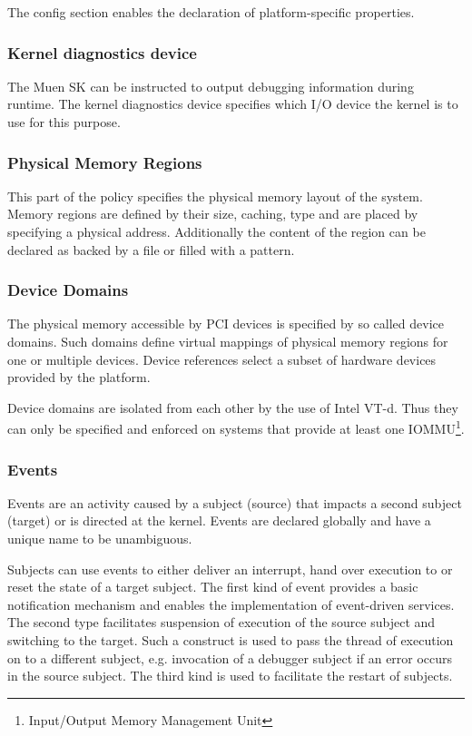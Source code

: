\documentclass[a4paper,twoside,titlepage]{article}
\begin{document}
The config section enables the declaration of platform-specific properties.

\subsubsection{Kernel diagnostics device}
The Muen SK can be instructed to output debugging information during runtime.
The kernel diagnostics device specifies which I/O device the kernel is to use
for this purpose.

\subsubsection{Physical Memory Regions}
This part of the policy specifies the physical memory layout of the system.
Memory regions are defined by their size, caching, type and are placed by
specifying a physical address. Additionally the content of the region can be
declared as backed by a file or filled with a pattern.

\subsubsection{Device Domains}
The physical memory accessible by PCI devices is specified by so called device
domains. Such domains define virtual mappings of physical memory regions for one
or multiple devices. Device references select a subset of hardware devices
provided by the platform.

Device domains are isolated from each other by the use of Intel VT-d. Thus they
can only be specified and enforced on systems that provide at least one
IOMMU\footnote{Input/Output Memory Management Unit}.

\subsubsection{Events}
Events are an activity caused by a subject (source) that impacts a second
subject (target) or is directed at the kernel. Events are declared globally and
have a unique name to be unambiguous.

Subjects can use events to either deliver an interrupt, hand over execution to
or reset the state of a target subject. The first kind of event provides a
basic notification mechanism and enables the implementation of event-driven
services. The second type facilitates suspension of execution of the source
subject and switching to the target. Such a construct is used to pass the
thread of execution on to a different subject, e.g. invocation of a debugger
subject if an error occurs in the source subject. The third kind is used to
facilitate the restart of subjects.
\end{document}
